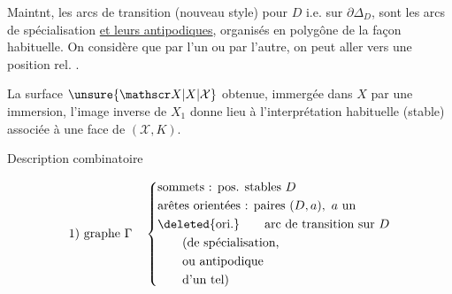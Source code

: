Maintnt, les arcs de transition (nouveau style) pour $D$ i.e. sur $\partial\Delta_D$, sont les arcs de spécialisation \uline{et leurs antipodiques}, organisés en polygône de la façon habituelle. On considère que par l'un ou par l'autre, on peut aller vers une position rel. .

La surface $\unsure{\mathscr X|X|\mathcal X}$ obtenue, immergée dans $X$ par une immersion,  l'image inverse  de $X_1$  donne lieu à  l'interprétation habituelle    (stable) associée à une face de $(\mathscr X,K)$.

Description combinatoire

\[
\begin{aligned}
\text{1) graphe }\Gamma\quad\left\{\begin{aligned}
&\text{sommets : pos. stables }D\\
&\text{arêtes orientées : paires }(D,a),\ a\text{ un}\\
&\deleted{\text{ori.}}\qquad\text{arc de transition sur }D\\
&\qquad\text{(de spécialisation,}\\
&\qquad\text{ou antipodique}\\
&\qquad\text{d'un tel)}
\end{aligned}\right.
\end{aligned}
\]
